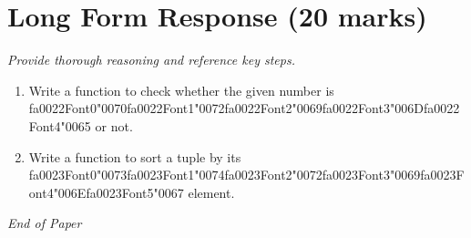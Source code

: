 \documentclass[12pt]{article}
\begin{document}
\section*{Long Form Response (20 marks)}
\textit{Provide thorough reasoning and reference key steps.}
\begin{enumerate}[label=\arabic*.]
\item Write a function to check whether the given number is {\csname fa0022Font0\endcsname\char"0070}{\csname fa0022Font1\endcsname\char"0072}{\csname fa0022Font2\endcsname\char"0069}{\csname fa0022Font3\endcsname\char"006D}{\csname fa0022Font4\endcsname\char"0065} or not.
\item Write a function to sort a tuple by its {\csname fa0023Font0\endcsname\char"0073}{\csname fa0023Font1\endcsname\char"0074}{\csname fa0023Font2\endcsname\char"0072}{\csname fa0023Font3\endcsname\char"0069}{\csname fa0023Font4\endcsname\char"006E}{\csname fa0023Font5\endcsname\char"0067} element.
\end{enumerate}

\vfill
\noindent\textit{End of Paper}
\end{document}
